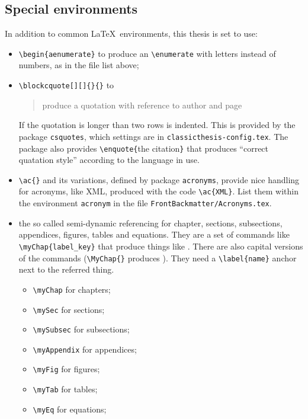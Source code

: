 \subsection{Special environments}\label{subsec:special_env}
In addition to common \LaTeX\ environments, this thesis is set to use:
\begin{itemize}


	\item \verb!\begin{aenumerate}! to produce an \verb!\enumerate! with letters instead of numbers, as in the file list above;

	\item \verb!\blockcquote[][]{}{}! to \blockcquote[see][p. 111]{bringhurst:2002}{produce a quotation with reference to author and page}.
	If the quotation is longer than two rows is indented. This is provided by the package \verb!csquotes!, which settings are in \verb!classicthesis-config.tex!. 
	The package also provides \verb!\enquote{!the citation\verb!}! that produces \enquote{correct quatation style} according to the language in use.

	\item \verb!\ac{}! and its variations, defined by package \verb!acronyms!, provide nice handling for acronyms, like \ac{XML}, produced with the code \verb!\ac{XML}!.
	List them within the environment \verb!acronym! in the file \verb!FrontBackmatter/Acronyms.tex!.

	\item the so called semi-dynamic referencing for chapter, sections, subsections, appendices, figures, tables and equations.
	They are a set of commands like \verb!\myChap{label_key}! that produce things like .
	There are also capital versions of the commands (\verb!\MyChap{}! produces ).
	They need a \verb!\label{name}! anchor next to the referred thing.
	\begin{itemize}
		\item\verb!\myChap! for chapters;
		\item\verb!\mySec! for sections;
		\item\verb!\mySubsec! for subsections;
		\item\verb!\myAppendix! for appendices;
		\item\verb!\myFig! for figures;
		\item\verb!\myTab! for tables;
		\item\verb!\myEq! for equations;
	\end{itemize}


\end{itemize}
